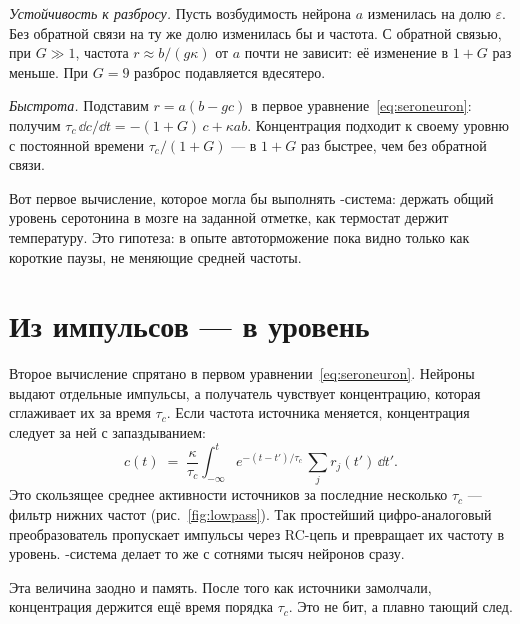 \emph{Устойчивость к разбросу.} Пусть возбудимость нейрона $a$ изменилась на долю $\varepsilon$. Без обратной связи на ту же долю изменилась бы и частота. С обратной связью, при $G\gg1$, частота $r\approx b/(g\kappa)$ от $a$ почти не зависит: её изменение в $1+G$ раз меньше. При $G=9$ разброс подавляется вдесятеро.

\emph{Быстрота.} Подставим $r=a(b-gc)$ в первое уравнение~\eqref{eq:seroneuron}: получим $\tau_c\,\dd c/\dd t=-(1+G)\,c+\kappa ab$. Концентрация подходит к своему уровню с постоянной времени $\tau_c/(1+G)$ --- в $1+G$ раз быстрее, чем без обратной связи.

Вот первое вычисление, которое могла бы выполнять -система: держать общий уровень серотонина в мозге на заданной отметке, как термостат держит температуру. Это гипотеза: в опыте автоторможение пока видно только как короткие паузы, не меняющие средней частоты.

\section{Из импульсов --- в уровень}

Второе вычисление спрятано в первом уравнении~\eqref{eq:seroneuron}. Нейроны выдают отдельные импульсы, а получатель чувствует концентрацию, которая сглаживает их за время $\tau_c$. Если частота источника меняется, концентрация следует за ней с запаздыванием:
\begin{equation}
c(t) \;=\; \frac{\kappa}{\tau_c}\int_{-\infty}^{t} e^{-(t-t')/\tau_c}\,\sum_j r_j(t')\,\dd t' .
\label{eq:lowpass}
\end{equation}
Это скользящее среднее активности источников за последние несколько $\tau_c$ --- фильтр нижних частот (рис.~\ref{fig:lowpass}). Так простейший цифро-аналоговый преобразователь пропускает импульсы через RC-цепь и превращает их частоту в уровень. -система делает то же с сотнями тысяч нейронов сразу.

Эта величина заодно и память. После того как источники замолчали, концентрация держится ещё время порядка $\tau_c$. Это не бит, а плавно тающий след.

